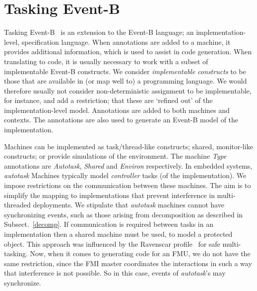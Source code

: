 \documentclass{llncs}%
\begin{document}
\section{Tasking Event-B}\label{TEB}
Tasking Event-B~\cite{ae2011a} is an extension to the Event-B language; an implementation-level, specification language. When annotations are added to a machine, it provides additional information, which is used to assist in code generation. When translating to code, it is usually necessary to work with a subset of implementable Event-B constructs. We consider \emph{implementable constructs} to be those that are available in (or map well to) a programming language. We would therefore usually not consider non-deterministic assignment to be implementable, for instance, and add a restriction; that these are `refined out' of the implementation-level model. Annotations are added to both machines and contexts. The annotations are also used to generate an Event-B model of the implementation. 

Machines can be implemented as task/thread-like constructs; shared, monitor-like constructs; or provide simulations of the environment.  The machine \emph{Type} annotations are \emph{Autotask}, \emph{Shared} and \emph{Environ} respectively.  In embedded systems, \emph{autotask} Machines typically model \emph{controller} tasks (of the implementation). We impose restrictions on the communication between these machines. The aim is to simplify the mapping to implementations that prevent interference in multi-threaded deployments. We stipulate that \emph{autotask} machines cannot have synchronizing events, such as those arising from decomposition as described in Subsect.~\ref{decomp}. If communication is required between tasks in an implementation then a shared machine must be used, to model a protected object. This approach was influenced by the Ravenscar profile~\cite{Burns1999} for safe multi-tasking. Now, when it comes to generating code for an FMU, we do not have the same restriction, since the FMI master coordinates the interactions in such a way that interference is not possible. So in this case, events of \emph{autotask}'s may synchronize.
\end{document}
